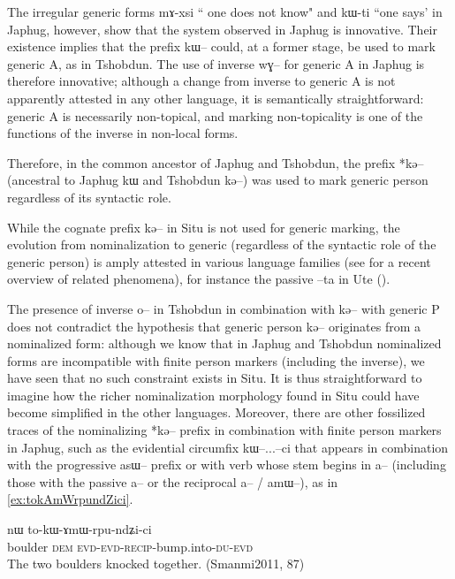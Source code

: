 \documentclass[oldfontcommands,oneside,a4paper,11pt]{article}
\newcommand{\ipa}[1]{{\phon \mbox{#1}}} %
\begin{document}
The irregular generic  forms \ipa{mɤ-xsi} `` one does not know" and \ipa{kɯ-ti} ``one says'  in Japhug, however, show that the system observed in Japhug is innovative. Their existence  implies that the prefix \ipa{kɯ--} could, at a former stage, be used to mark generic A, as in Tshobdun. The use of inverse \ipa{wɣ--} for generic A in Japhug is therefore innovative; although a change from inverse to generic A is not apparently attested in any other language, it is semantically straightforward: generic A is necessarily non-topical, and marking non-topicality is one of the functions of the inverse in non-local forms.

Therefore, in the common ancestor of Japhug and Tshobdun, the prefix *\ipa{kə--} (ancestral to Japhug \ipa{kɯ} and Tshobdun \ipa{kə--}) was used to mark generic person regardless of its syntactic role. 

While the cognate prefix \ipa{kə--} in Situ is not used for generic marking, the evolution from nominalization to generic (regardless of the syntactic role of the generic person) is amply attested in various language families (see \citealt{sanso14nmlz} for a recent overview of related phenomena), for instance the passive \ipa{--ta} in Ute (\citealt[264-7]{givon11ute}). %


The presence of inverse \ipa{o--} in Tshobdun in combination with \ipa{kə--} with generic P does not contradict the hypothesis that generic person \ipa{kə--} originates from a nominalized form: although we know that in Japhug and Tshobdun nominalized forms are incompatible with finite person markers (including the inverse), we have seen that no such constraint exists in Situ. It is thus straightforward to imagine how the richer nominalization morphology found in Situ could have become simplified in the other languages. Moreover, there are other fossilized traces of the nominalizing *\ipa{kə--} prefix in combination with finite person markers in Japhug, such as the evidential circumfix \ipa{kɯ--}...\ipa{--ci} that appears in combination with the progressive \ipa{asɯ--} prefix or with verb whose stem begins in \ipa{a--} (including those with the passive \ipa{a--} or the reciprocal \ipa{a--} / \ipa{amɯ--}), as in \ref{ex:tokAmWrpundZici}. 


\begin{exe}
\ex \label{ex:tokAmWrpundZici}
\gll \ipa{rŋgɯ}  	\ipa{nɯ}  	\ipa{to-kɯ-ɤmɯ-rpu-ndʑi-ci}  \\
boulder \textsc{dem} \textsc{evd}-\textsc{evd}-\textsc{recip}-bump.into-\textsc{du}-\textsc{evd} \\
\glt The two boulders knocked together. (Smanmi2011, 87)
\end{exe}
\end{document}
